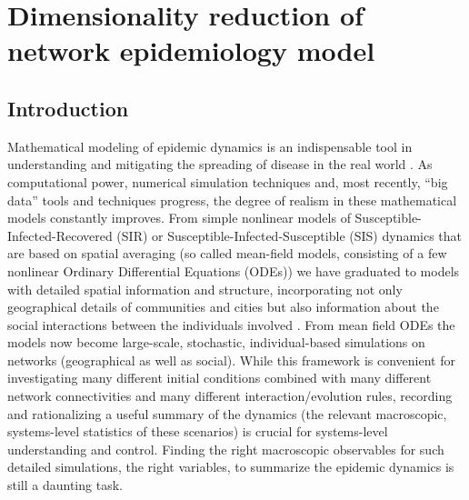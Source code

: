 \chapter{Dimensionality reduction of network epidemiology
  model \label{ch:sis}}

\section{Introduction}

Mathematical modeling of epidemic dynamics is an indispensable tool in
understanding and mitigating the spreading of disease in the real
world
\cite{gross_epidemic_2006,pastor-satorras_epidemic_2015,segbroeck_adaptive_2010,zhou_epidemic_2012}.
As computational power, numerical simulation techniques and, most
recently, “big data” tools and techniques progress, the degree of
realism in these mathematical models constantly improves. From simple
nonlinear models of Susceptible-Infected-Recovered (SIR) or
Susceptible-Infected-Susceptible (SIS) dynamics that are based on
spatial averaging (so called mean-field models, consisting of a few
nonlinear Ordinary Differential Equations (ODEs)) we have graduated to
models with detailed spatial information and structure, incorporating
not only geographical details of communities and cities but also
information about the social interactions between the individuals
involved
\cite{colizza_modeling_2006,wang_epidemic_2011,eubank_modelling_2004}.
From mean field ODEs the models now become large-scale, stochastic,
individual-based simulations on networks (geographical as well as
social).  While this framework is convenient for investigating many
different initial conditions combined with many different network
connectivities and many different interaction/evolution rules,
recording and rationalizing a useful summary of the dynamics (the
relevant macroscopic, systems-level statistics of these scenarios) is
crucial for systems-level understanding and control. Finding the right
macroscopic observables for such detailed simulations, the right
variables, to summarize the epidemic dynamics is still a daunting
task.

